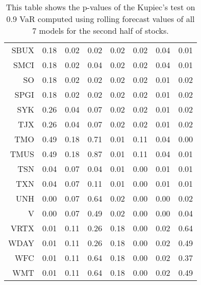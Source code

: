 \begin{table}[ht]
\begin{tabular}{rrrrrrrr}
  SBUX & 0.18 & 0.02 & 0.02 & 0.02 & 0.02 & 0.04 & 0.01 \\ 
  SMCI & 0.18 & 0.02 & 0.04 & 0.02 & 0.02 & 0.04 & 0.01 \\ 
  SO & 0.18 & 0.02 & 0.02 & 0.02 & 0.02 & 0.01 & 0.02 \\ 
  SPGI & 0.18 & 0.02 & 0.02 & 0.02 & 0.02 & 0.01 & 0.02 \\ 
  SYK & 0.26 & 0.04 & 0.07 & 0.02 & 0.02 & 0.01 & 0.02 \\ 
  TJX & 0.26 & 0.04 & 0.07 & 0.02 & 0.02 & 0.01 & 0.02 \\ 
  TMO & 0.49 & 0.18 & 0.71 & 0.01 & 0.11 & 0.04 & 0.00 \\ 
  TMUS & 0.49 & 0.18 & 0.87 & 0.01 & 0.11 & 0.04 & 0.01 \\ 
  TSN & 0.04 & 0.07 & 0.04 & 0.01 & 0.00 & 0.01 & 0.01 \\ 
  TXN & 0.04 & 0.07 & 0.11 & 0.01 & 0.00 & 0.01 & 0.01 \\ 
  UNH & 0.00 & 0.07 & 0.64 & 0.02 & 0.00 & 0.00 & 0.02 \\ 
  V & 0.00 & 0.07 & 0.49 & 0.02 & 0.00 & 0.00 & 0.04 \\ 
  VRTX & 0.01 & 0.11 & 0.26 & 0.18 & 0.00 & 0.02 & 0.64 \\ 
  WDAY & 0.01 & 0.11 & 0.26 & 0.18 & 0.00 & 0.02 & 0.49 \\ 
  WFC & 0.01 & 0.11 & 0.64 & 0.18 & 0.00 & 0.02 & 0.37 \\ 
  WMT & 0.01 & 0.11 & 0.64 & 0.18 & 0.00 & 0.02 & 0.49 \\ 
   \hline
\end{tabular}
\caption[Kupiec's test p-values, alpha =0.9 (2)]{This table shows the p-values of the Kupiec's test on 0.9 VaR computed using rolling forecast values of all 7 models for the second half of stocks.} 
\label{Table:Kupiec_test_rolling_0.9_2}
\end{table}
